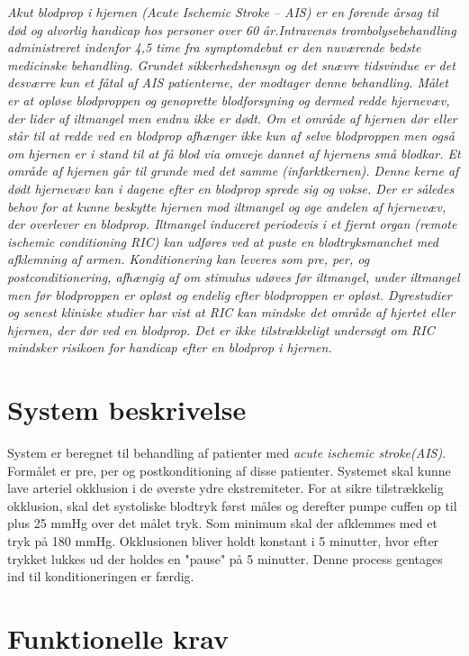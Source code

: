 	{\textit{Akut blodprop i hjernen (Acute Ischemic Stroke – AIS) er en førende årsag til død og alvorlig handicap hos personer over 60 år.Intravenøs trombolysebehandling administreret indenfor 4,5 time fra symptomdebut er den nuværende bedste medicinske behandling. Grundet sikkerhedshensyn og det snævre tidsvindue er det desværre kun et fåtal af AIS patienterne, der modtager denne behandling. Målet er at opløse blodproppen og genoprette blodforsyning og dermed redde hjernevæv, der lider af iltmangel men endnu ikke er dødt. Om et område af hjernen dør eller står til at redde ved en blodprop afhænger ikke kun af selve blodproppen men også om hjernen er i stand til at få blod via omveje dannet af hjernens små blodkar. Et område af hjernen går til grunde med det samme (infarktkernen). Denne kerne af dødt hjernevæv kan i dagene efter en blodprop sprede sig og vokse. Der er således behov for at kunne beskytte hjernen mod iltmangel og øge andelen af hjernevæv, der overlever en blodprop. Iltmangel induceret periodevis i et fjernt organ (remote ischemic conditioning RIC) kan udføres ved at puste en blodtryksmanchet med afklemning af armen. Konditionering kan leveres som pre, per, og postconditionering, afhængig af om stimulus udøves før iltmangel, under iltmangel men før blodproppen er opløst og endelig efter blodproppen er opløst. Dyrestudier og senest kliniske studier har vist at RIC kan mindske det område af hjertet eller hjernen, der dør ved en blodprop. Det er ikke tilstrækkeligt undersøgt om RIC mindsker risikoen for handicap efter en blodprop i hjernen.}
	
	\section{System beskrivelse}
	System er beregnet til behandling af patienter med \textit{acute ischemic stroke(AIS)}. Formålet er pre, per og postkonditioning af disse patienter. Systemet skal kunne lave arteriel okklusion i de øverste ydre ekstremiteter. For at sikre tilstrækkelig okklusion, skal det systoliske blodtryk først måles og derefter pumpe cuffen op til plus 25 mmHg over det målet tryk. Som minimum skal der afklemmes med et tryk på 180 mmHg. Okklusionen bliver holdt konstant i 5 minutter, hvor efter trykket lukkes ud der holdes en "pause" på 5 minutter. Denne process gentages ind til konditioneringen er færdig. 

	\section{Funktionelle krav}
	
}
